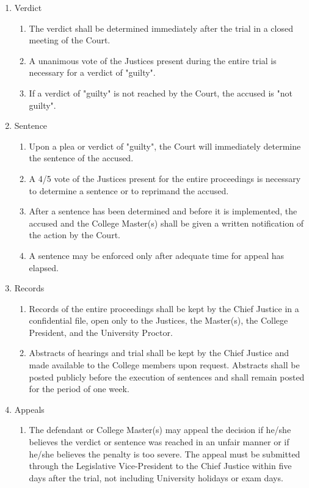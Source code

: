 \documentclass[11pt]{amsart}
\begin{document}
\begin{enumerate}
\begin{enumerate}
\begin{enumerate}
			\end{enumerate}
		\item Verdict
			\begin{enumerate}
			\item The verdict shall be determined immediately after the trial in a closed meeting of the Court.
			\item A unanimous vote of the Justices present during the entire trial is necessary for a verdict of "guilty".
			\item If a verdict of "guilty" is not reached by the Court, the accused is "not guilty".
			\end{enumerate}
		\item Sentence
			\begin{enumerate}
			\item Upon a plea or verdict of "guilty", the Court will immediately determine the sentence of the accused.
			\item A 4/5 vote of the Justices present for the entire proceedings is necessary to determine a sentence or to reprimand the accused.
			\item After a sentence has been determined and before it is implemented, the accused and the College Master(s) shall be given a written notification of the action by the Court.
			\item A sentence may be enforced only after adequate time for appeal has elapsed.
			\end{enumerate}
		\item Records
			\begin{enumerate}
			\item Records of the entire proceedings shall be kept by the Chief Justice in a confidential file, open only to the Justices, the Master(s), the College President, and the University Proctor.
			\item Abstracts of hearings and trial shall be kept by the Chief Justice and made available to the College members upon request. Abstracts shall be posted publicly before the execution of sentences and shall remain posted for the period of one week.
			\end{enumerate}
		\item Appeals
			\begin{enumerate}
			\item The defendant or College Master(s) may appeal the decision if he/she
believes the verdict or sentence was reached in an unfair manner or if he/she believes the penalty is too severe. The appeal must be submitted through the Legislative Vice-President to the Chief Justice within five days after the trial, not including University holidays or exam days.

\end{enumerate}
\end{enumerate}
\end{enumerate}
\end{document}
